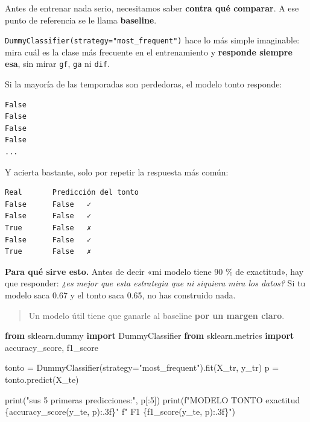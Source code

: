 \documentclass[
]{article}
\newenvironment{Shaded}{}{}
\newcommand{\BuiltInTok}[1]{\textcolor[rgb]{0.00,0.50,0.00}{#1}}
\newcommand{\DecValTok}[1]{\textcolor[rgb]{0.25,0.63,0.44}{#1}}
\newcommand{\ImportTok}[1]{\textcolor[rgb]{0.00,0.50,0.00}{\textbf{#1}}}
\newcommand{\NormalTok}[1]{#1}
\newcommand{\OperatorTok}[1]{\textcolor[rgb]{0.40,0.40,0.40}{#1}}
\newcommand{\SpecialCharTok}[1]{\textcolor[rgb]{0.25,0.44,0.63}{#1}}
\newcommand{\SpecialStringTok}[1]{\textcolor[rgb]{0.73,0.40,0.53}{#1}}
\newcommand{\StringTok}[1]{\textcolor[rgb]{0.25,0.44,0.63}{#1}}
\begin{document}
Antes de entrenar nada serio, necesitamos saber \textbf{contra qué
comparar}. A ese punto de referencia se le llama \textbf{baseline}.

\texttt{DummyClassifier(strategy="most\_frequent")} hace lo más simple
imaginable: mira cuál es la clase más frecuente en el entrenamiento y
\textbf{responde siempre esa}, sin mirar \texttt{gf}, \texttt{ga} ni
\texttt{dif}.

Si la mayoría de las temporadas son perdedoras, el modelo tonto
responde:

\begin{verbatim}
False
False
False
False
...
\end{verbatim}

Y acierta bastante, solo por repetir la respuesta más común:

\begin{verbatim}
Real       Predicción del tonto
False      False   ✓
False      False   ✓
True       False   ✗
False      False   ✓
True       False   ✗
\end{verbatim}

\textbf{Para qué sirve esto.} Antes de decir «mi modelo tiene 90 \% de
exactitud», hay que responder: \emph{¿es mejor que esta estrategia que
ni siquiera mira los datos?} Si tu modelo saca 0.67 y el tonto saca
0.65, no has construido nada.

\begin{quote}
Un modelo útil tiene que ganarle al baseline \textbf{por un margen
claro}.
\end{quote}

\protect{}\label{94bd3b4c}
\begin{Shaded}
\begin{Highlighting}[]
\ImportTok{from}\NormalTok{ sklearn.dummy }\ImportTok{import}\NormalTok{ DummyClassifier}
\ImportTok{from}\NormalTok{ sklearn.metrics }\ImportTok{import}\NormalTok{ accuracy\_score, f1\_score}

\NormalTok{tonto }\OperatorTok{=}\NormalTok{ DummyClassifier(strategy}\OperatorTok{=}\StringTok{"most\_frequent"}\NormalTok{).fit(X\_tr, y\_tr)}
\NormalTok{p }\OperatorTok{=}\NormalTok{ tonto.predict(X\_te)}

\BuiltInTok{print}\NormalTok{(}\StringTok{"sus 5 primeras predicciones:"}\NormalTok{, p[:}\DecValTok{5}\NormalTok{])}
\BuiltInTok{print}\NormalTok{(}\SpecialStringTok{f"MODELO TONTO   exactitud }\SpecialCharTok{\{}\NormalTok{accuracy\_score(y\_te, p)}\SpecialCharTok{:.3f\}}\SpecialStringTok{"}
      \SpecialStringTok{f"   F1 }\SpecialCharTok{\{}\NormalTok{f1\_score(y\_te, p)}\SpecialCharTok{:.3f\}}\SpecialStringTok{"}\NormalTok{)}
\end{Highlighting}
\end{Shaded}
\end{document}
